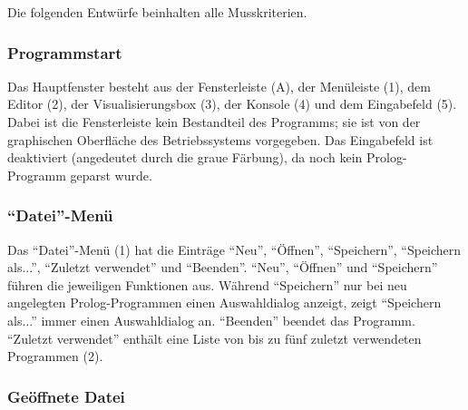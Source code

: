 \documentclass[parskip=full,11pt,twoside]{scrartcl}
\begin{document}
Die folgenden Entwürfe beinhalten alle Musskriterien.

\subsubsection{Programmstart}

\begin{minipage}{\linewidth}
\end{minipage}

Das Hauptfenster besteht aus der Fensterleiste (A), der Menüleiste (1), dem Editor (2), der Visualisierungsbox (3), der Konsole (4) und dem Eingabefeld (5).
Dabei ist die Fensterleiste kein Bestandteil des Programms; sie ist von der graphischen Oberfläche des Betriebssystems vorgegeben.
Das Eingabefeld ist deaktiviert (angedeutet durch die graue Färbung), da noch kein Prolog-Programm geparst wurde.

\subsubsection{\enquote{Datei}-Menü}

\begin{minipage}{\linewidth}
\end{minipage}

Das \enquote{Datei}-Menü (1) hat die Einträge \enquote{Neu}, \enquote{Öffnen}, \enquote{Speichern}, \enquote{Speichern als...}, \enquote{Zuletzt verwendet} und \enquote{Beenden}.
\enquote{Neu}, \enquote{Öffnen} und \enquote{Speichern} führen die jeweiligen Funktionen aus.
Während \enquote{Speichern} nur bei neu angelegten Prolog-Programmen einen Auswahldialog anzeigt, zeigt \enquote{Speichern als...} immer einen Auswahldialog an.
\enquote{Beenden} beendet das Programm.
\enquote{Zuletzt verwendet} enthält eine Liste von bis zu fünf zuletzt verwendeten Programmen (2).

\subsubsection{Geöffnete Datei}

\begin{minipage}{\linewidth}
\end{minipage}
\end{document}
